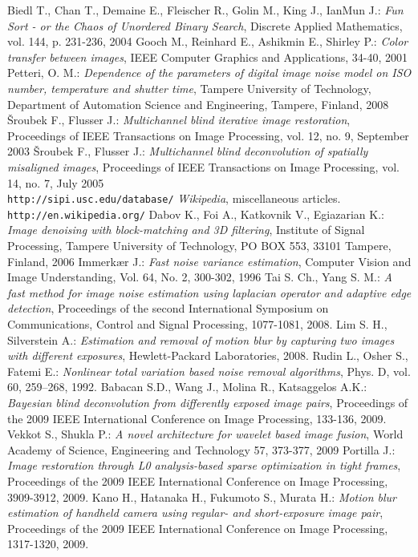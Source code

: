 \documentclass[12pt,notitlepage]{report}
\begin{document}
\begin{thebibliography}{xxxxx-99}
 Biedl T., Chan T., Demaine E., Fleischer R., Golin M., King J., IanMun J.: {\em Fun Sort - or the Chaos of Unordered Binary Search},  Discrete Applied Mathematics, vol. 144, p. 231-236, 2004
 Gooch M., Reinhard E., Ashikmin E., Shirley P.: {\em Color transfer between images}, IEEE Computer Graphics and Applications, 34-40, 2001
 Petteri, O. M.: {\em Dependence of the parameters of digital image noise model on ISO number, temperature and shutter time}, Tampere University of Technology, Department of Automation Science and Engineering, Tampere, Finland, 2008
 Šroubek F., Flusser J.: {\em Multichannel blind iterative image restoration}, Proceedings of IEEE Transactions on Image Processing, vol. 12, no. 9, September 2003
 Šroubek F., Flusser J.: {\em Multichannel blind deconvolution of spatially misaligned images},	Proceedings of IEEE Transactions on Image Processing, vol. 14, no. 7, July 2005
  \\ \texttt{http://sipi.usc.edu/database/}
  {\em Wikipedia}, miscellaneous articles. \\ \texttt{http://en.wikipedia.org/}
  Dabov K., Foi A., Katkovnik V., Egiazarian K.: {\em Image denoising with block-matching and 3D filtering}, Institute of Signal Processing, Tampere University of Technology, PO BOX 553, 33101 Tampere, Finland, 2006
  Immerkær J.: {\em Fast noise variance estimation}, Computer Vision and Image Understanding, Vol. 64, No. 2, 300-302, 1996
  Tai S. Ch., Yang S. M.: {\em A fast method for image noise estimation using laplacian operator and adaptive edge detection}, Proceedings of the second International Symposium on Communications, Control and Signal Processing, 1077-1081, 2008.
  Lim S. H., Silverstein A.: {\em Estimation and removal of motion blur by capturing two images with different exposures}, Hewlett-Packard Laboratories, 2008. 
  Rudin L., Osher S., Fatemi E.: {\em Nonlinear total variation based noise removal algorithms}, Phys. D, vol. 60, 259–268, 1992.
  Babacan S.D., Wang J., Molina R., Katsaggelos A.K.: {\em Bayesian blind deconvolution from differently exposed image pairs}, Proceedings of the 2009 IEEE International Conference on Image Processing, 133-136, 2009.
  Vekkot S.,  Shukla P.: {\em A novel architecture for wavelet based image fusion}, World Academy of Science, Engineering and Technology 57, 373-377, 2009
  Portilla J.: {\em Image restoration through L0 analysis-based sparse optimization in tight frames}, Proceedings of the 2009 IEEE International Conference on Image Processing, 3909-3912, 2009.
  Kano H., Hatanaka H., Fukumoto S., Murata H.: {\em Motion blur estimation of handheld camera using regular- and short-exposure image pair}, Proceedings of the 2009 IEEE International Conference on Image Processing, 1317-1320, 2009.
\end{thebibliography}
\end{document}
